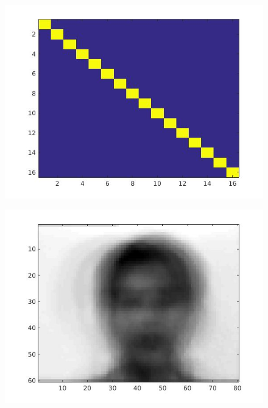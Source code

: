 \documentclass{article}
\begin{document}
\begin{figure}[H]

\includegraphics[scale =.5]{report5_1}
\end{figure}


\begin{figure}[H]


\includegraphics[scale =.5]{report6_1}
\end{figure}

\begin{figure}[H]

\end{figure}
\end{document}
